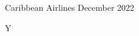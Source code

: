 \documentclass[letterpaper]{article}
\begin{document}
\begin{center}
	Caribbean Airlines December 2022
	\begin{crossword}{15}{Y}
		
	\end{crossword}
\end{center}
\end{document}
